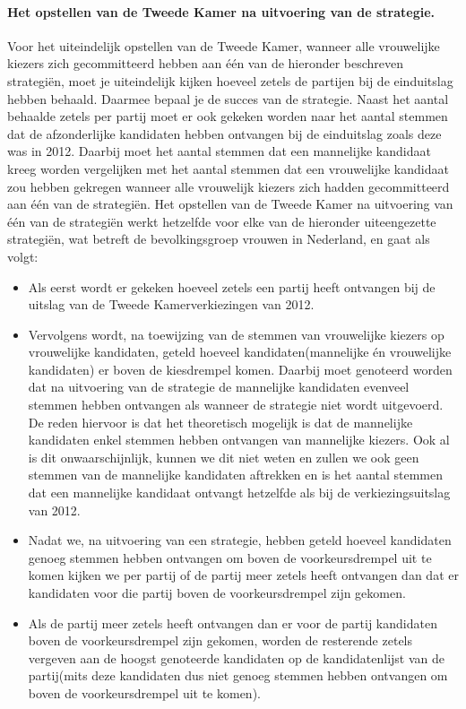 \paragraph{Het opstellen van de Tweede Kamer na uitvoering van de strategie.} 
Voor het uiteindelijk opstellen van de Tweede Kamer, wanneer alle vrouwelijke kiezers zich gecommitteerd hebben aan één van de hieronder beschreven strategi\"{e}n, moet je uiteindelijk kijken hoeveel zetels de partijen bij de einduitslag hebben behaald. Daarmee bepaal je de succes van de strategie. Naast het aantal behaalde zetels per partij moet er ook gekeken worden naar het aantal stemmen dat de afzonderlijke kandidaten hebben ontvangen bij de einduitslag zoals deze was in 2012. Daarbij moet het aantal stemmen dat een mannelijke kandidaat kreeg worden vergelijken met het aantal stemmen dat een vrouwelijke kandidaat zou hebben gekregen wanneer alle vrouwelijk kiezers zich hadden gecommitteerd aan één van de strategi\"{e}n. Het opstellen van de Tweede Kamer na uitvoering van één van de strategi\"{e}n werkt hetzelfde voor elke van de hieronder uiteengezette strategi\"{e}n, wat betreft de bevolkingsgroep vrouwen in Nederland, en gaat als volgt: 
\begin{itemize}
	\item
Als eerst wordt er gekeken hoeveel zetels een partij heeft ontvangen bij de uitslag van de Tweede Kamerverkiezingen van 2012. 
	\item
Vervolgens wordt, na toewijzing van de stemmen van vrouwelijke kiezers op vrouwelijke kandidaten, geteld hoeveel kandidaten(mannelijke én vrouwelijke kandidaten) er boven de kiesdrempel komen. Daarbij moet genoteerd worden dat na uitvoering van de strategie de mannelijke kandidaten evenveel stemmen hebben ontvangen als wanneer de strategie niet wordt uitgevoerd. De reden hiervoor is dat het theoretisch mogelijk is dat de mannelijke kandidaten  enkel stemmen hebben ontvangen van mannelijke kiezers. Ook al is dit onwaarschijnlijk, kunnen we dit niet weten en zullen we ook geen stemmen van de mannelijke kandidaten aftrekken en is het aantal stemmen dat een mannelijke kandidaat ontvangt hetzelfde als bij de verkiezingsuitslag van 2012.
	\item
Nadat we, na uitvoering van een strategie, hebben geteld hoeveel kandidaten genoeg stemmen hebben ontvangen om boven de voorkeursdrempel uit te komen kijken we per partij of de partij meer zetels heeft ontvangen dan dat er kandidaten voor die partij boven de voorkeursdrempel zijn gekomen. 
	\item
Als de partij meer zetels heeft ontvangen dan er voor de partij kandidaten boven de voorkeursdrempel zijn gekomen, worden de resterende zetels vergeven aan de hoogst genoteerde kandidaten op de kandidatenlijst van de partij(mits deze kandidaten dus niet genoeg stemmen hebben ontvangen om boven de voorkeursdrempel uit te komen).
\end{itemize}


